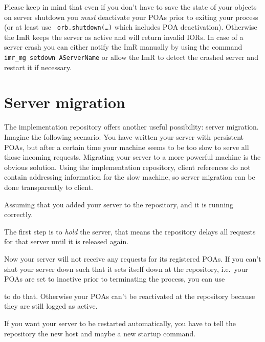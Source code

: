 Please keep in mind  that even if you don't have to  save the state of
your objects  on server shutdown  you {\em must} deactivate  your POAs
prior   to   exiting   your    process   (or   at   least   use   {\tt
orb.shutdown(\dots)} which  includes POA deactivation).  Otherwise the
ImR keeps the  server as active and will return  invalid IORs. In case
of  a  server crash  you  can either notify the ImR manually by  using
the  command  {\tt imr\_mg  setdown AServerName} or allow the ImR to
detect the crashed server and restart it if necessary.

\section{Server migration}

The  implementation  repository  offers  another  useful  possibility:
server migration.   Imagine the  following scenario: You  have written
your  server with  persistent  POAs,  but after  a  certain time  your
machine  seems   to  be   too  slow  to   serve  all   those  incoming
requests.  Migrating your  server to  a more  powerful machine  is the
obvious  solution.    Using  the  implementation   repository,  client
references do not contain addressing information for the slow machine,
so server migration can be done transparently to client.

Assuming  that you  added your  server to  the repository,  and  it is
running  correctly.


The first step is to {\em  hold} the server, that means the repository
delays all requests for that server until it is released again.


Now  your server  will not  receive  any requests  for its  registered
POAs. If you can't shut your server down such that it sets itself down
at  the repository,  i.e.~your POAs  are  set to  inactive prior  to
terminating the process, you can use


to  do  that.   Otherwise  your  POAs  can't  be  reactivated  at  the
repository because they are still logged as active.

If you  want your  server to be  restarted automatically, you  have to
tell the repository the new host and maybe a new startup command.

